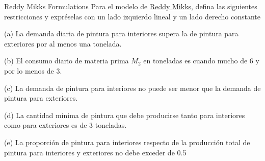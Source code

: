 \begin{frameact}{Reddy Mikks Formulations}{}
 Para el modelo de \hyperlink{example:reddy-mikks}{Reddy Mikks}, defina las siguientes restricciones y expréselas con un lado izquierdo lineal y un lado derecho constante

(a) La demanda diaria de pintura para interiores supera la de pintura para exteriores
por al menos una tonelada.

(b) El consumo diario de materia prima $M_2$ en toneladas es cuando mucho de 6 y por
lo menos de 3.

(c) La demanda de pintura para interiores no puede ser menor que la demanda de pintura para exteriores.

(d) La cantidad mínima de pintura que debe producirse tanto para interiores como para exteriores es de 3 toneladas.

(e) La proporción de pintura para interiores respecto de la producción total de pintura
para interiores y exteriores no debe exceder de 0.5

\end{frameact}


